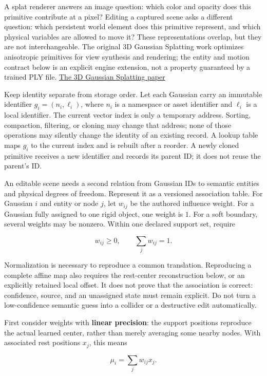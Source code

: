 A splat renderer answers an image question: which color and opacity does this primitive contribute at a pixel? Editing a captured scene asks a different question: which persistent world element does this primitive represent, and which physical variables are allowed to move it? These representations overlap, but they are not interchangeable. The original 3D Gaussian Splatting work optimizes anisotropic primitives for view synthesis and rendering; the entity and motion contract below is an explicit engine extension, not a property guaranteed by a trained PLY file. \href{https://arxiv.org/abs/2308.04079}{The 3D Gaussian Splatting paper}

Keep identity separate from storage order. Let each Gaussian carry an immutable identifier \(g_i=(n_i,\ell_i)\), where \(n_i\) is a namespace or asset identifier and \(\ell_i\) is a local identifier. The current vector index is only a temporary address. Sorting, compaction, filtering, or cloning may change that address; none of those operations may silently change the identity of an existing record. A lookup table maps \(g_i\) to the current index and is rebuilt after a reorder. A newly cloned primitive receives a new identifier and records its parent ID; it does not reuse the parent's ID.

An editable scene needs a second relation from Gaussian IDs to semantic entities and physical degrees of freedom. Represent it as a versioned association table. For Gaussian \(i\) and entity or node \(j\), let \(w_{ij}\) be the authored influence weight. For a Gaussian fully assigned to one rigid object, one weight is \(1\). For a soft boundary, several weights may be nonzero. Within one declared support set, require

\[
w_{ij}\ge 0,\qquad \sum_j w_{ij}=1.
\]

Normalization is necessary to reproduce a common translation. Reproducing a complete affine map also requires the rest-center reconstruction below, or an explicitly retained local offset. It does not prove that the association is correct: confidence, source, and an unassigned state must remain explicit. Do not turn a low-confidence semantic guess into a collider or a destructive edit automatically.

First consider weights with \textbf{linear precision}: the support positions reproduce the actual learned center, rather than merely averaging some nearby nodes. With associated rest positions \(x_j\), this means

\[
\mu_i=\sum_jw_{ij}x_j.
\]


